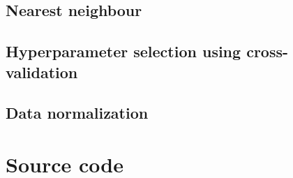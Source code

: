 \documentclass[a4paper, 11pt]{article}
\begin{document}
\subsection{Nearest neighbour}
\label{sub:nearest_neighbour}

\subsection{Hyperparameter selection using cross-validation}
\label{sub:hyperparameter_selection_using_cross_validation}

\subsection{Data normalization}
\label{sub:data_normalization}

\appendix
\section{Source code}
\label{sec:source_code}
\end{document}
